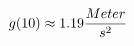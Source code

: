 \documentclass[preview]{standalone}
\begin{document}
\begin{align*}
\special{dvisvgm:raw <g id='unique000'>}g(10) \approx 1.19 \frac{Meter}{s^{2}}\special{dvisvgm:raw </g>}
\end{align*}
\end{document}
